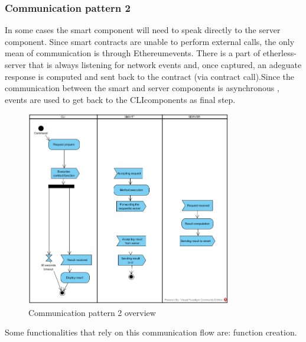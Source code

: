\subsubsection{Communication pattern 2}
In some cases the smart component will need to speak directly to the server component. Since smart contracts are unable to perform external calls, the only mean of communication is through Ethereum\glo events. There is a part of etherless-server that is always listening for network events and, once captured, an adeguate response is computed and sent back to the contract (via contract call).\newline Since the communication between the smart and server components is asynchronous , events are used to get back to the CLI\glo components as final step.
\begin{figure}[H]
	\centering
	\includegraphics[width=0.8\textwidth]{res/img/pattern1.jpg}
	\caption{Communication pattern 2 overview}
\end{figure}
\noindent Some functionalities that rely on this communication flow are: function creation.
\newpage
